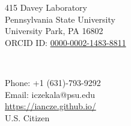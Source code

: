 \parbox[t]{3in}{
\begin{flushleft}
415 Davey Laboratory\\
Pennsylvania State University\\
University Park, PA 16802\\
ORCID ID: \href{http://orcid.org/0000-0002-1483-8811}{0000-0002-1483-8811} \\
\end{flushleft}} \ \hfill  \
\parbox[t]{3in}{
\begin{flushright}
Phone: +1 (631)-793-9292\\
Email: iczekala@psu.edu\\
\url{https://iancze.github.io/}\\
U.S. Citizen
\end{flushright}}

